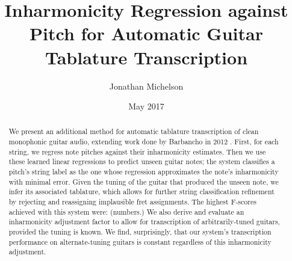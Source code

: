 \documentclass[12pt]{cmuthesis}
\begin{document}
 
\frontmatter

\pagestyle{empty}

\title{ %
{\bf Inharmonicity Regression against Pitch for Automatic Guitar Tablature Transcription}}
\author{Jonathan Michelson}
\date{May 2017}
\trnumber{}


\support{}
\disclaimer{}



\maketitle


\pagestyle{plain} %


\begin{abstract}
We present an additional method for automatic tablature transcription of clean monophonic guitar audio, extending work done by Barbancho in 2012 \cite{barbanchoi2012}. First, for each string, we regress note pitches against their inharmonicity estimates. Then we use these learned linear regressions to predict unseen guitar notes; the system classifies a pitch's string label as the one whose regression approximates the note's inharmonicity with minimal error. Given the tuning of the guitar that produced the unseen note, we infer its associated tablature, which allows for further string classification refinement by rejecting and reassigning implausible fret assignments. The highest F-scores achieved with this system were: (numbers.) We also derive and evaluate an inharmonicity adjustment factor to allow for transcription of arbitrarily-tuned guitars, provided the tuning is known. We find, surprisingly, that our system's transcription performance on alternate-tuning guitars is constant regardless of this inharmonicity adjustment.

\end{abstract}
\end{document}
